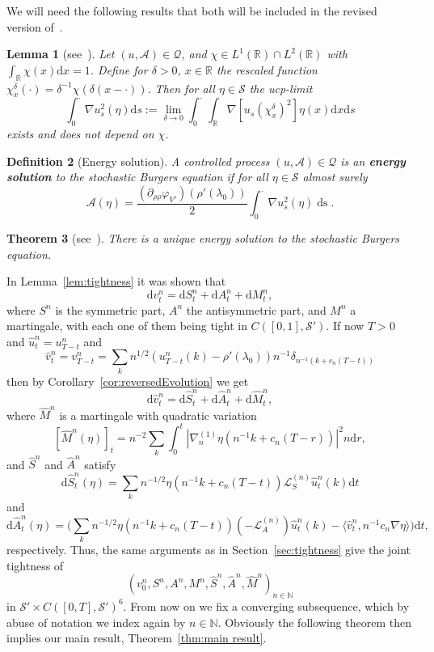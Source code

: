 \documentclass[11pt, a4paper]{article}
\newcommand{\assign}{:=}
\newcommand{\cdummy}{\cdot}
\newcommand{\mathd}{\mathrm{d}}
\newcommand{\nocomma}{}
\newcommand{\tmop}[1]{\ensuremath{\operatorname{#1}}}
\newcommand{\tmtextbf}[1]{{\bfseries{#1}}}
\newtheorem{theorem}{Theorem}[section]
\newtheorem{definition}[theorem]{Definition}
\newtheorem{lemma}[theorem]{Lemma}
\newcommand{\CS}{\mathscr{S}}
\newcommand{\CL}{\mathcal{L}}
\newcommand{\1}{\mathbf{1}}
\begin{document}
We will need the following results that both will be included in the revised version of~\cite{bib:energyUniqueness}.

\begin{lemma}[see~{\cite{bib:energyUniqueness}}]\label{lem:Burgers nonlinearity}
  Let $(u, \mathcal{A}) \in \mathcal{Q}$, and $\chi \in L^1 (\mathbb{R}) \cap
  L^2 (\mathbb{R})$ with $\int_{\mathbb{R}} \chi (x) \mathd x = 1$. Define
  for $\delta > 0 \nocomma$, $x \in \mathbb{R}$ the rescaled function
  $\chi^{\delta}_x (\cdot) = \delta^{- 1} \chi (\delta (x -
  \cdummy)) .$ Then for all $\eta \in \CS$ the ucp-limit
  \[  \int_0^{\cdummy} \nabla u_s^2 (\eta) \mathd s \assign \lim_{\delta \rightarrow 0} \int_0^{\cdummy} \int_{\mathbb{R}}
     \nabla [u_s (\chi^{\delta}_x)^2] \eta (x) \mathd x \mathd s \]
  exists and does not depend on $\chi$.
\end{lemma}

\begin{definition}[Energy solution]
  A controlled process $(u, \mathcal{A}) \in \mathcal{Q}$ is an
  \tmtextbf{energy solution} to the stochastic Burgers equation if for all
  $\eta \in \CS$ almost surely
  \[ \mathcal{A} (\eta) = \frac{(\partial_{\rho \rho} \varphi_{V'}) (\rho'
     (\lambda_0))}{2} \int_{0^{}}^{\cdummy} \nabla u_s^2 (\eta) \tmop{ds} . \]
\end{definition}

\begin{theorem}[see~{\cite{bib:energyUniqueness}}]
   There is a unique energy solution to the stochastic Burgers equation.
\end{theorem}


In Lemma~\ref{lem:tightness} it was shown that
\[ \mathd v^n_t = \mathd S^n_t + \mathd A^n_t + \mathd M^n_t, \]
where $S^n$ is the symmetric part, $A^n$ the antisymmetric part, and $M^n$ a
martingale, with each one of them being tight in $C \left( [0, 1], \CS'
\right)$. If now $T > 0$ and $\hat{u}^n_t = u^n_{T - t}$ and
\[ \hat{v}^n_t = v^n_{T - t} = \sum_k n^{1 / 2} (u^n_{T - t} (k) - \rho'
   (\lambda_0)) n^{- 1} \delta_{n^{- 1} (k + c_n (T - t))} \]
then by Corollary~\ref{cor:reversedEvolution} we get
\[ \mathd \hat{v}^n_t = \mathd \hat{S}^n_t + \mathd \hat{A}^n_t + \mathd
   \hat{M}^n_t, \]
where $\hat{M}^n$ is a martingale with quadratic variation
\[ [\hat{M}^n (\eta)]_t = n^{- 2} \sum_k \int_0^t | \nabla^{(1)}_n \eta (n^{-
   1} k + c_n (T - r)) |^2 n \mathd r, \]
and $\hat{S}^n$ and $\hat{A}^n$ satisfy
\[ \mathd \hat{S}^n_t (\eta) = \sum_k n^{- 1 / 2} \eta (n^{- 1} k + c_n (T -
   t)) \CL^{(n)}_S \hat{u}^n_t (k) \mathd t \]
and
\[ \mathd \hat{A}^n_t (\eta) = \Big( \sum_k n^{- 1 / 2} \eta (n^{- 1} k + c_n
   (T - t)) (- \CL^{(n)}_A) \hat{u}^n_t (k) - \langle \hat{v}^n_t, n^{- 1} c_n
   \nabla \eta \rangle \Big) \mathd t, \]
respectively. Thus, the same arguments as in Section~\ref{sec:tightness} give
the joint tightness of
\[ (v^n_0, S^n, A^n, M^n, \hat{S}^n, \hat{A}^n, \hat{M}^n)_{n \in \mathbb{N}}
\]
in $\CS' \times C \left( [0, T], \CS' \right)^6$. From now on we fix a
converging subsequence, which by abuse of notation we index again by $n \in
\mathbb{N}$. Obviously the following theorem then implies
our main result, Theorem~\ref{thm:main result}.
\end{document}

